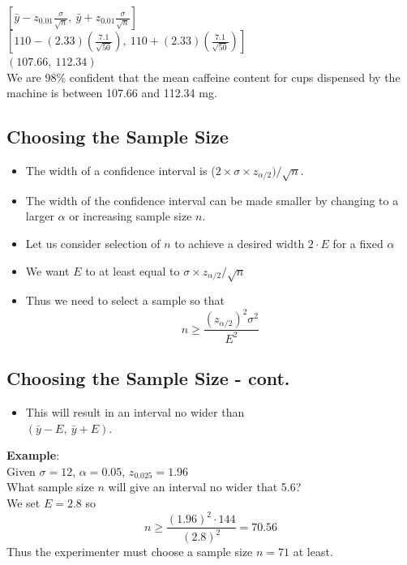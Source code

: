 \documentclass[
  letterpaper,
  DIV=11,
  numbers=noendperiod]{scrartcl}
\providecommand{\tightlist}{%
  \setlength{\itemsep}{0pt}\setlength{\parskip}{0pt}}\usepackage{longtable,booktabs,array}
\begin{document}
\(\left[\bar{y} - z_{0.01} \frac{\sigma}{\sqrt{n}}, \
\bar{y} + z_{0.01} \frac{\sigma}{\sqrt{n}}\right]\)\\
\(\left[110 - (2.33)\left(\frac{7.1}{\sqrt{50}}\right), \
   110 + (2.33)\left(\frac{7.1}{\sqrt{50}}\right)  \right]\)\\
\((107.66,\ 112.34)\)\\
We are \(98\%\) confident that the mean caffeine content for cups
dispensed by the machine is between 107.66 and 112.34 mg.

\subsection{Choosing the Sample Size}\label{choosing-the-sample-size}

\begin{itemize}
\item
  The {width} of a confidence interval is
  (\(2 \times \sigma \times z_{\alpha/2})/\sqrt{n}\).
\item
  The width of the confidence interval can be made smaller by changing
  to a larger \(\alpha\) or increasing sample size \(n\).
\item
  Let us consider selection of \(n\) to achieve a desired width
  \(2 \cdot E\) for a fixed \(\alpha\)
\item
  We want \(E\) to at least equal to
  \(\sigma \times z_{\alpha/2}/\sqrt{n}\)
\item
  Thus we need to select a sample so that
  \[n \geq \frac{(z_{\alpha/2})^2\sigma^2}{E^2}\]
\end{itemize}

\subsection{Choosing the Sample Size -
cont.}\label{choosing-the-sample-size---cont.}

\begin{itemize}
\tightlist
\item
  This will result in an interval no wider than\\
  \((\bar{y} - E,\ \bar{y} + E)\).
\end{itemize}

{\textbf{Example}:}\\
Given \(\sigma = 12\), \(\alpha = 0.05\), \(z_{0.025} = 1.96\)\\
What sample size \(n\) will give an interval no wider that 5.6?\\
We set \(E = 2.8\) so
\[n \geq \frac{(1.96)^2 \cdot 144}{(2.8)^2} = 70.56\] Thus the
experimenter must choose a sample size \(n = 71\) at least.
\end{document}
